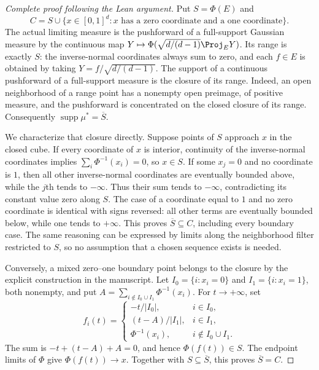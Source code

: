 \begin{proof}[Complete proof following the Lean argument]
Put $S=\Phi(E)$ and
\[
 C=S\cup\{x\in[0,1]^d:\text{$x$ has a zero coordinate and a one coordinate}\}.
\]
The actual limiting measure is the pushforward of a full-support Gaussian
measure by the continuous map
$Y\mapsto\Phi(\sqrt{d/(d-1)}\Proj_EY)$.
Its range is exactly $S$: the inverse-normal coordinates always sum to zero,
and each $f\in E$ is obtained by taking $Y=f/\sqrt{d/(d-1)}$.
The support of a continuous pushforward of a full-support measure is the
closure of its range. Indeed, an open neighborhood of a range point has
a nonempty open preimage, of positive measure, and the pushforward is
concentrated on the closed closure of its range. Consequently
$\operatorname{supp}\mu^\ast=\overline S$.

We characterize that closure directly. Suppose points of $S$ approach
$x$ in the closed cube. If every coordinate of $x$ is interior, continuity
of the inverse-normal coordinates implies
$\sum_i\Phi^{-1}(x_i)=0$, so $x\in S$.
If some $x_j=0$ and no coordinate is $1$, then all other inverse-normal
coordinates are eventually bounded above, while the $j$th tends to
$-\infty$. Thus their sum tends to $-\infty$, contradicting its constant
value zero along $S$.
The case of a coordinate equal to $1$ and no zero coordinate is identical
with signs reversed: all other terms are eventually bounded below, while
one tends to $+\infty$.
This proves $\overline S\subseteq C$, including every boundary case.
The same reasoning can be expressed by limits along the neighborhood
filter restricted to $S$, so no assumption that a chosen sequence exists
is needed.

Conversely, a mixed zero--one boundary point belongs to the closure by the
explicit construction in the manuscript. Let
$I_0=\{i:x_i=0\}$ and $I_1=\{i:x_i=1\}$, both nonempty, and put
$A=\sum_{i\notin I_0\cup I_1}\Phi^{-1}(x_i)$.
For $t\to+\infty$, set
\[
 f_i(t)=
 \begin{cases}
  -t/|I_0|,&i\in I_0,\\
  (t-A)/|I_1|,&i\in I_1,\\
  \Phi^{-1}(x_i),&i\notin I_0\cup I_1.
 \end{cases}
\]
The sum is $-t+(t-A)+A=0$, and hence $\Phi(f(t))\in S$.
The endpoint limits of $\Phi$ give $\Phi(f(t))\to x$.
Together with $S\subseteq\overline S$, this proves $\overline S=C$.


\end{proof}

